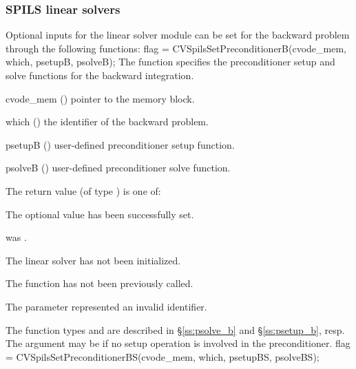 \subsubsection{SPILS linear solvers}
Optional inputs for the {\cvspils} linear solver module can be set for the backward
problem through the following functions:
{
  flag = CVSpilsSetPreconditionerB(cvode\_mem, which, psetupB, psolveB);
}
{
  The function  specifies the preconditioner
  setup and solve functions for the backward integration.
}
{
  \begin{args}[psetupB]
  \item[cvode\_mem] ()
    pointer to the {\cvodes} memory block.
  \item[which] ()
    the identifier of the backward problem.
  \item[psetupB] ()
    user-defined preconditioner setup function.
  \item[psolveB] ()
    user-defined preconditioner solve function.
  \end{args}
}
{
  The return value  (of type ) is one of:
  \begin{args}
  \item[\Id{CVSPILS\_SUCCESS}] 
    The optional value has been successfully set.
  \item[\Id{CVSPILS\_MEM\_NULL}]
     was .
  \item[\Id{CVSPILS\_LMEM\_NULL}]
    The {\cvspils} linear solver has not been initialized.
  \item[\Id{CVSPILS\_NO\_ADJ}]
    The function  has not been previously called.
  \item[\Id{CVSPILS\_ILL\_INPUT}]
    The parameter  represented an invalid identifier.
  \end{args}
}
{
   The function types  and  are
   described in \S\ref{ss:psolve_b} and \S\ref{ss:psetup_b}, resp.
   The  argument may be  if no setup operation is involved
   in the preconditioner.
}
{
  flag = CVSpilsSetPreconditionerBS(cvode\_mem, which, psetupBS, psolveBS);
}
